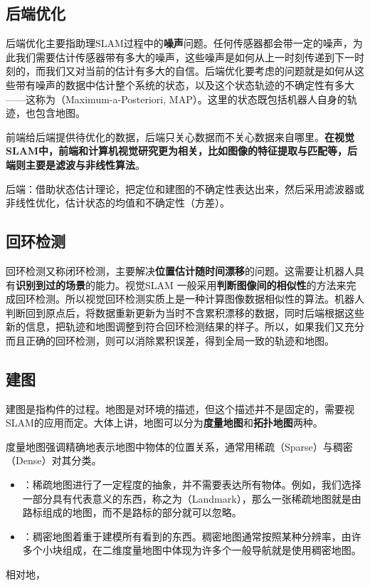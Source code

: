 \subsection{后端优化}
后端优化主要指助理SLAM过程中的\textbf{噪声}问题。任何传感器都会带一定的噪声，为此我们需要估计传感器带有多大的噪声，这些噪声是如何从上一时刻传递到下一时刻的，而我们又对当前的估计有多大的自信。后端优化要考虑的问题就是如何从这些带有噪声的数据中估计整个系统的状态，以及这个状态轨迹的不确定性有多大——这称为（Maximum-a-Posteriori, MAP）。这里的状态既包括机器人自身的轨迹，也包含地图。

前端给后端提供待优化的数据，后端只关心数据而不关心数据来自哪里。\textbf{在视觉SLAM中，前端和计算机视觉研究更为相关，比如图像的特征提取与匹配等，后端则主要是滤波与非线性算法}。

后端：借助状态估计理论，把定位和建图的不确定性表达出来，然后采用滤波器或非线性优化，估计状态的均值和不确定性（方差）。

\subsection{回环检测}
回环检测又称闭环检测，主要解决\textbf{位置估计随时间漂移}的问题。这需要让机器人具有\textbf{识别到过的场景}的能力。视觉SLAM 一般采用\textbf{判断图像间的相似性}的方法来完成回环检测。所以视觉回环检测实质上是一种计算图像数据相似性的算法。机器人判断回到原点后，将数据重新更新为当时不含累积漂移的数据，同时后端根据这些新的信息，把轨迹和地图调整到符合回环检测结果的样子。所以，如果我们又充分而且正确的回环检测，则可以消除累积误差，得到全局一致的轨迹和地图。

\subsection{建图}
建图是指构件的过程。地图是对环境的描述，但这个描述并不是固定的，需要视SLAM的应用而定。大体上讲，地图可以分为\textbf{度量地图}和\textbf{拓扑地图}两种。

\nob[1] 

度量地图强调精确地表示地图中物体的位置关系，通常用稀疏（Sparse）与稠密（Dense）对其分类。
\begin{itemize}[itemsep=0.1pt,topsep =2pt]
    \item {}：稀疏地图进行了一定程度的抽象，并不需要表达所有物体。例如，我们选择一部分具有代表意义的东西，称之为（Landmark），那么一张稀疏地图就是由路标组成的地图，而不是路标的部分就可以忽略。
    \item {}：稠密地图着重于建模所有看到的东西。稠密地图通常按照某种分辨率，由许多个小块组成，在二维度量地图中体现为许多个一般导航就是使用稠密地图。
\end{itemize}
相对地，




